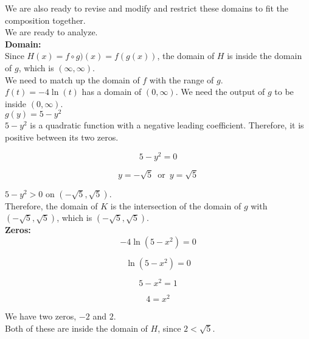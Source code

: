 \documentclass{ximera}
\begin{document}
We are also ready to revise and modify and restrict these domains to fit the composition together. \\




We are ready to analyze. \\




\textbf{\textcolor{blue!55!black}{Domain:}} \\



Since $H(x) = f \circ g)(x) = f(g(x))$, the domain of $H$ is inside the domain of $g$, which is $(\infty, \infty)$. \\

We need to match up the domain of $f$ with the range of $g$. \\


$f(t) = -4 \ln(t)$ has a domain of $(0, \infty)$.  We need the output of $g$ to be inside $(0, \infty)$. \\



$g(y) = 5 - y^2$ \\



$5 - y^2$ is a quadratic function with a negative leading coefficient.  Therefore, it is positive between its two zeros.


\[
5 - y^2 = 0
\]

\[
y = -\sqrt{5}  \,  \text{ or } \, y = \sqrt{5} 
\]




$5 - y^2 > 0$ on $(-\sqrt{5}, \sqrt{5})$. \\




Therefore, the domain of $K$ is the intersection of the domain of $g$ with $(-\sqrt{5}, \sqrt{5})$, which is $(-\sqrt{5}, \sqrt{5})$. \\



\textbf{\textcolor{blue!55!black}{Zeros:}} \\




\[
-4 \ln(5 - x^2) = 0
\]


\[
 \ln(5 - x^2) = 0
\]


\[
5 - x^2 = 1
\]


\[
4 = x^2
\]


We have two zeros, $-2$ and $2$. \\

Both of these are inside the domain of $H$, since $2 < \sqrt{5}$. \\
\end{document}
